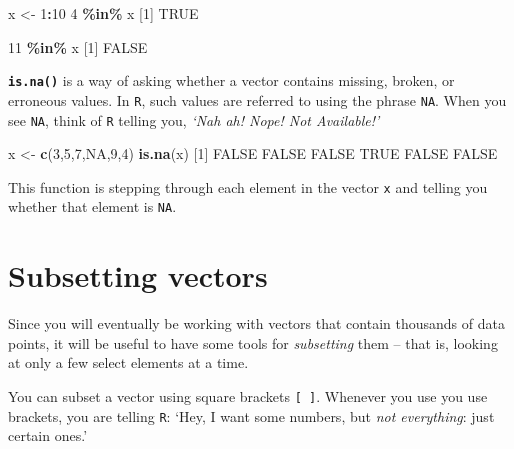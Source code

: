 \documentclass[
]{book}
\newenvironment{Shaded}{\begin{snugshade}}{\end{snugshade}}
\newcommand{\ConstantTok}[1]{\textcolor[rgb]{0.56,0.35,0.01}{#1}}
\newcommand{\DecValTok}[1]{\textcolor[rgb]{0.00,0.00,0.81}{#1}}
\newcommand{\FunctionTok}[1]{\textcolor[rgb]{0.13,0.29,0.53}{\textbf{#1}}}
\newcommand{\NormalTok}[1]{#1}
\newcommand{\OtherTok}[1]{\textcolor[rgb]{0.56,0.35,0.01}{#1}}
\newcommand{\SpecialCharTok}[1]{\textcolor[rgb]{0.81,0.36,0.00}{\textbf{#1}}}
\begin{document}
\begin{Shaded}
\begin{Highlighting}[]
\NormalTok{x }\OtherTok{\textless{}{-}} \DecValTok{1}\SpecialCharTok{:}\DecValTok{10}
\DecValTok{4} \SpecialCharTok{\%in\%}\NormalTok{ x}
\NormalTok{[}\DecValTok{1}\NormalTok{] }\ConstantTok{TRUE}
\end{Highlighting}
\end{Shaded}

\begin{Shaded}
\begin{Highlighting}[]
\DecValTok{11} \SpecialCharTok{\%in\%}\NormalTok{ x}
\NormalTok{[}\DecValTok{1}\NormalTok{] }\ConstantTok{FALSE}
\end{Highlighting}
\end{Shaded}

\textbf{\texttt{is.na()}} is a way of asking whether a vector contains missing, broken, or erroneous values. In \texttt{R}, such values are referred to using the phrase \texttt{NA}. When you see \texttt{NA}, think of \texttt{R} telling you, \emph{`Nah ah! Nope! Not Available!'}

\begin{Shaded}
\begin{Highlighting}[]
\NormalTok{x }\OtherTok{\textless{}{-}} \FunctionTok{c}\NormalTok{(}\DecValTok{3}\NormalTok{,}\DecValTok{5}\NormalTok{,}\DecValTok{7}\NormalTok{,}\ConstantTok{NA}\NormalTok{,}\DecValTok{9}\NormalTok{,}\DecValTok{4}\NormalTok{)}
\FunctionTok{is.na}\NormalTok{(x)}
\NormalTok{[}\DecValTok{1}\NormalTok{] }\ConstantTok{FALSE} \ConstantTok{FALSE} \ConstantTok{FALSE}  \ConstantTok{TRUE} \ConstantTok{FALSE} \ConstantTok{FALSE}
\end{Highlighting}
\end{Shaded}

This function is stepping through each element in the vector \texttt{x} and telling you whether that element is \texttt{NA}.

\section*{Subsetting vectors}\label{subsetting-vectors}

Since you will eventually be working with vectors that contain thousands of data points, it will be useful to have some tools for \emph{subsetting} them -- that is, looking at only a few select elements at a time.

You can subset a vector using square brackets \texttt{{[}\ {]}}. Whenever you use you use brackets, you are telling \texttt{R}: `Hey, I want some numbers, but \emph{not everything}: just certain ones.'
\end{document}
